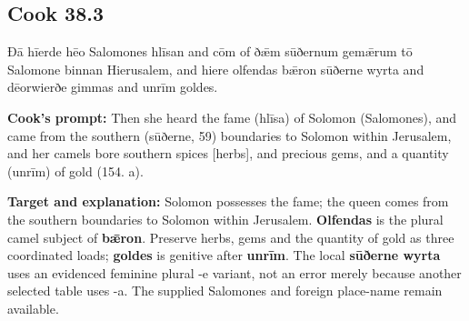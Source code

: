 \par\begin{minipage}{\linewidth}\raggedright
\subsection*{Cook 38.3}

Ðā hīerde hēo Salomones hlīsan and cōm of ðǣm sūðernum gemǣrum tō Salomone binnan Hierusalem, and hiere olfendas bǣron sūðerne wyrta and dēorwierðe gimmas and unrīm goldes.

\textbf{Cook's prompt:} Then she heard the fame (hlīsa) of Solomon (Salomones), and came from the southern (sūðerne, 59) boundaries to Solomon within Jerusalem, and her camels bore southern spices [herbs], and precious gems, and a quantity (unrīm) of gold (154. a).

\textbf{Target and explanation:} Solomon possesses the fame; the queen comes from the southern boundaries to Solomon within Jerusalem. \textbf{Olfendas} is the plural camel subject of \textbf{bǣron}. Preserve herbs, gems and the quantity of gold as three coordinated loads; \textbf{goldes} is genitive after \textbf{unrīm}. The local \textbf{sūðerne wyrta} uses an evidenced feminine plural -e variant, not an error merely because another selected table uses -a. The supplied Salomones and foreign place-name remain available.

\end{minipage}\par\addvspace{4pt}

